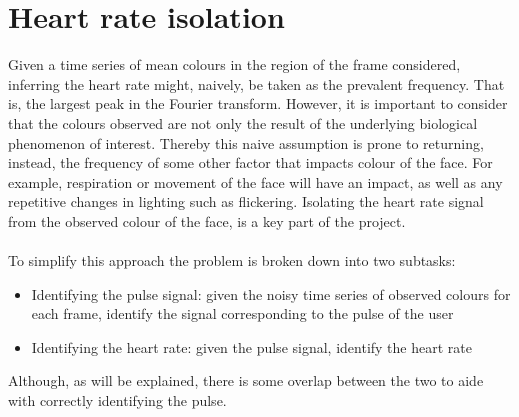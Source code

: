 \section{Heart rate isolation}
Given a time series of mean colours in the region of the frame considered, inferring the heart rate might, naively, be taken as the prevalent frequency. That is, the largest peak in the Fourier transform. 
However, it is important to consider that the colours observed are not only the result of the underlying biological phenomenon of interest. Thereby this naive assumption is prone to returning, instead,
 the frequency of some other factor that impacts colour of the face. For example, respiration or movement of the face will have an impact, as well as any repetitive changes in lighting such as flickering. 
 Isolating the heart rate signal from the observed colour of the face, is a key part of the project.
\\\\
To simplify this approach the problem is broken down into two subtasks:
\begin{itemize}
    \item Identifying the pulse signal: given the noisy time series of observed colours for each frame, identify the signal corresponding to the pulse of the user
    \item Identifying the heart rate: given the pulse signal, identify the heart rate
\end{itemize}
Although, as will be explained, there is some overlap between the two to aide with correctly identifying the pulse.

